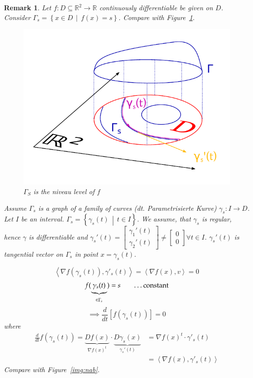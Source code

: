 \documentclass{article}
\newtheorem{remark}{Remark}  \numberwithin{remark}{section}
\newcommand{\setdef}[2]{\left\{\left.#1\,\middle|\,#2\right.\right\}}
\newcommand{\angel}[1]{\left\langle#1\right\rangle}
\begin{document}
\begin{remark}
  Let $f: D \subseteq \mathbb R^2 \to \mathbb R$ continuously differentiable be given on $D$.
  Consider $\Gamma_s = \setdef{x \in D}{f(x) = s}$. Compare with Figure~\ref{img:niveau}.

  \begin{figure}[!h]
    \begin{center}
      \includegraphics{img/32_niveau.pdf}
      \caption{$\Gamma_S$ is the niveau level of $f$}
      \label{img:niveau}
    \end{center}
  \end{figure}

  Assume $\Gamma_s$ is a graph of a family of curves (dt. \foreignlanguage{german}{Parametrisierte Kurve}) $\gamma_s: I \to D$.
  Let $I$ be an interval. $\Gamma_s = \setdef{\gamma_s(t)}{t \in I}$. We assume, that $\gamma_s$ is regular, hence $\gamma$ is differentiable
  and $\gamma_s'(t) = \begin{bmatrix} \gamma_1'(t) \\ \gamma_2'(t) \end{bmatrix} \neq \begin{bmatrix} 0 \\ 0 \end{bmatrix} \forall t \in I$.
  $\gamma_s'(t)$ is tangential vector on $\Gamma_s$ in point $x = \gamma_s(t)$.

  \[ \angel{\nabla f(\gamma_s(t)), \gamma'_s(t)} = \angel{\nabla f(x), v} = 0 \]
  \[ f(\underbrace{\gamma_s(t)}_{\in \Gamma_s}) = s \qquad \text{\dots constant} \]
  \[ \implies \frac{d}{dt} [f(\gamma_s(t))] = 0  \]
  where
  \begin{align*}
    \frac{d}{dt} f(\gamma_s(t))
      = \underbrace{D f(x)}_{\nabla f(x)^t} \cdot \underbrace{D \gamma_s(x)}_{\gamma_s'(t)}
      &= \nabla f(x)^t \cdot \gamma'_s(t) \\
      &= \angel{\nabla f(x), \gamma'_s(t)}
  \end{align*}
  Compare with Figure~\ref{img:nab}.


\end{remark}
\end{document}
